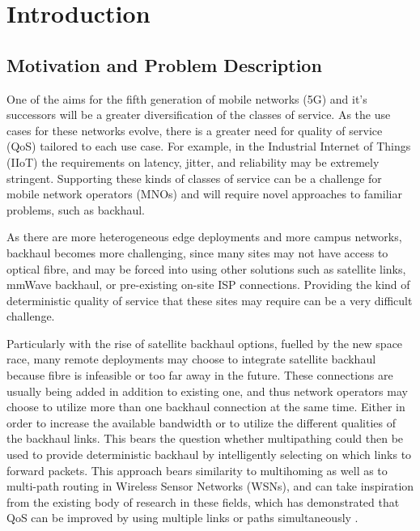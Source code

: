 
\cleardoublepage
\chapter{Introduction}

\label{cha:introduction}

\section{Motivation and Problem Description}
\label{sec:motivation}

One of the aims for the fifth generation of mobile networks (5G) and it's successors will be a greater diversification of the classes of service. As the use cases for these networks evolve, there is a greater need for quality of service (QoS) tailored to each use case. For example, in the Industrial Internet of Things (IIoT) the requirements on latency, jitter, and reliability may be extremely stringent. Supporting these kinds of classes of service can be a challenge for mobile network operators (MNOs) and will require novel approaches to familiar problems, such as backhaul.

As there are more heterogeneous edge deployments and more campus networks, backhaul becomes more challenging, since many sites may not have access to optical fibre, and may be forced into using other solutions such as satellite links, mmWave backhaul, or pre-existing on-site ISP connections. Providing the kind of deterministic quality of service that these sites may require can be a very difficult challenge.

Particularly with the rise of satellite backhaul options, fuelled by the new space race, many remote deployments may choose to integrate satellite backhaul because fibre is infeasible or too far away in the future. These connections are usually being added in addition to existing one, and thus network operators may choose to utilize more than one backhaul connection at the same time. Either in order to increase the available bandwidth or to utilize the different qualities of the backhaul links. This bears the question whether multipathing could then be used to provide deterministic backhaul by intelligently selecting on which links to forward packets. This approach bears similarity to multihoming as well as to multi-path routing in Wireless Sensor Networks (WSNs), and can take inspiration from the existing body of research in these fields, which has demonstrated that QoS can be improved by using multiple links or paths simultaneously \cite{akella2003measurement, tao2005improving, habib2007improving, goldenberg2004optimizing, huang2008multiconstrained, akella2008performance}.


